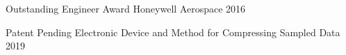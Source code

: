 \documentclass[]{awesome-cv}
\begin{document}
\vspace{-7mm}

\begin{cvhonors}
	\cvhonor
	{Outstanding Engineer Award}
	{Honeywell Aerospace }
	{}
	{2016}
\end{cvhonors}

\begin{cvhonors}
	\cvhonor
	{Patent Pending}
	{Electronic Device and Method for Compressing Sampled Data }
	{}
	{2019}
\end{cvhonors}
\end{document}
